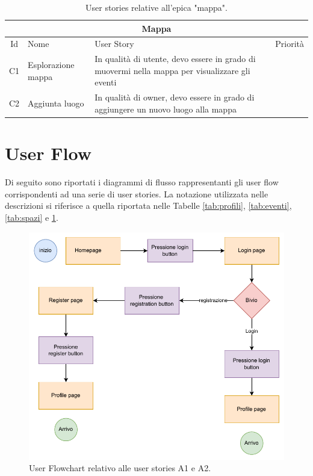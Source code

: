 \documentclass[9pt]{extarticle}
\begin{document}
\begin{table}[!htb]
	\centering
	\begin{tabular}{clp{7cm}l} %
		\toprule
		\multicolumn{4}{c}{\textbf{Mappa}}\\ \midrule
		Id & Nome & User Story & Priorità \\ \midrule
		C1  & Esplorazione mappa      & In qualità di utente, devo essere in grado di muovermi nella mappa per visualizzare gli eventi                           &  \\
		C2  & Aggiunta luogo          & In qualità di owner, devo essere in grado di aggiungere un nuovo luogo alla mappa                                        & \\
		\bottomrule
	\end{tabular}
	\caption{User stories relative all'epica "mappa".}
	\label{tab:mappa}
\end{table}

\newpage
\section{User Flow}

Di seguito sono riportati i diagrammi di flusso rappresentanti gli user flow corrispondenti ad una serie di user stories. La notazione utilizzata nelle descrizioni si riferisce a quella riportata nelle Tabelle \ref{tab:profili}, \ref{tab:eventi}, \ref{tab:spazi} e \ref{tab:mappa}.

\begin{figure}[!htb]
	\centering
	\includegraphics[width=0.8\linewidth]{./images/A1-A2.pdf}
	\caption{User Flowchart relativo alle user stories A1 e A2.}
	\label{fig:A1-A2}
\end{figure}
\end{document}
